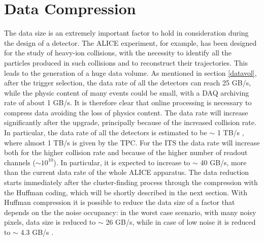 \section{Data Compression}
The data size is an extremely important factor to hold in consideration during the design of a detector. The ALICE experiment, for example, has been designed for the study of heavy-ion collisions, with the necessity to identify all the particles produced in such collisions and to reconstruct their trajectories. This leads to the generation of a huge data volume. As mentioned in section \ref{datavol}, after the trigger selection, the data rate of all the detectors can reach 25 GB/s, while the physic content of many events could be small, with a DAQ archiving rate of about 1 GB/s. It is therefore clear that online processing is necessary to compress data avoiding the loss of physics content. The data rate will increase significantly after the upgrade, principally because of the increased collision rate. In particular, the data rate of all the detectors is estimated to be $\sim$ 1 TB/s \cite{o2}, where almost 1 TB/s is given by the TPC. For the ITS the data rate will increase both for the higher collision rate and because of the higher number of readout channels ($\sim 10^{10}$). In particular, it is expected to increase to $\sim$ 40 GB/s, more than the current data rate of the whole ALICE apparatus. The data reduction starts immediately after the cluster-finding process through the compression with the Huffman coding, which will be shortly described in the next section. With Huffman compression it is possible to reduce the data size of a factor that depends on the the noise occupancy: in the worst case scenario, with many noisy pixels, data size is reduced to  $\sim$ 26 GB/s, while in case of low noise it is reduced to $\sim$ 4.3 GB/s \cite{o2}.
